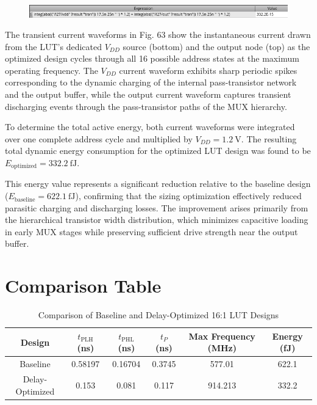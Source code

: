 \documentclass[12pt]{article}
\begin{document}
\begin{figure}[H]
    \centering
    \includegraphics[width=\linewidth]{writeup//figures/optimized_energy_val.png}
    \caption{}
\end{figure}

The transient current waveforms in Fig. 63 show the instantaneous current drawn from the LUT’s dedicated $V_{DD}$ source (bottom) and the output node (top) as the optimized design cycles through all 16 possible address states at the maximum operating frequency. The $V_{DD}$ current waveform exhibits sharp periodic spikes corresponding to the dynamic charging of the internal pass-transistor network and the output buffer, while the output current waveform captures transient discharging events through the pass-transistor paths of the MUX hierarchy.

To determine the total active energy, both current waveforms were integrated over one complete address cycle and multiplied by $V_{DD} = 1.2~\text{V}$. The resulting total dynamic energy consumption for the optimized LUT design was found to be $\boxed{E_{\text{optimized}} = 332.2~\text{fJ}}$.

This energy value represents a significant reduction relative to the baseline design (\(E_{\text{baseline}} = 622.1~\text{fJ}\)), confirming that the sizing optimization effectively reduced parasitic charging and discharging losses. The improvement arises primarily from the hierarchical transistor width distribution, which minimizes capacitive loading in early MUX stages while preserving sufficient drive strength near the output buffer.

\newpage

\section{Comparison Table}

\begin{table}[H]
\centering
\begin{tabular}{|c|c|c|c|c|c|}
\hline
\textbf{Design} & \textbf{$t_{\text{PLH}}$ (ns)} & \textbf{$t_{\text{PHL}}$ (ns)} & \textbf{$t_{P}$ (ns)} & \textbf{Max Frequency (MHz)} & \textbf{Energy (fJ)} \\ \hline
Baseline & 0.58197 & 0.16704 & 0.3745 & 577.01 & 622.1  \\ \hline
Delay-Optimized & 0.153 & 0.081 & 0.117 & 914.213 & 332.2  \\ \hline
\end{tabular}
\label{tab:comparison}
\caption{Comparison of Baseline and Delay-Optimized 16:1 LUT Designs}
\end{table}
\end{document}
